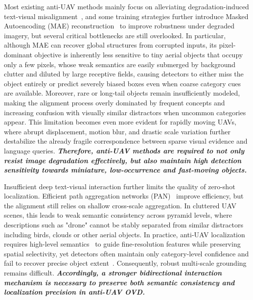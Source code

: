 \documentclass[letterpaper, 10 pt, conference]{ieeeconf}  %
\begin{document}
Most existing anti-UAV methods mainly focus on alleviating degradation-induced text-visual misalignment~\cite{drones9070495,zhu2019visdrone}, and some training strategies further introduce Masked Autoencoding (MAE) reconstruction~\cite{he2022mae,kang2023deblurmae} to improve robustness under degraded imagery, but several critical bottlenecks are still overlooked. In particular, although MAE can recover global structures from corrupted inputs, its pixel-dominant objective is inherently less sensitive to tiny aerial objects that occupy only a few pixels, whose weak semantics are easily submerged by background clutter and diluted by large receptive fields, causing detectors to either miss the object entirely or predict severely biased boxes even when coarse category cues are available. Moreover, rare or long-tail objects remain insufficiently modeled, making the alignment process overly dominated by frequent concepts and increasing confusion with visually similar distractors when uncommon categories appear. This limitation becomes even more evident for rapidly moving UAVs, where abrupt displacement, motion blur, and drastic scale variation further destabilize the already fragile correspondence between sparse visual evidence and language queries. \textbf{\textit{Therefore, anti-UAV methods are required to not only resist image degradation effectively, but also maintain high detection sensitivity towards miniature, low-occurrence and fast-moving objects.}}

Insufficient deep text-visual interaction further limits the quality of zero-shot localization. Efficient path aggregation networks (PAN)~\cite{cheng2024yoloworld,wang2025yoloe} improve efficiency, but the alignment still relies on shallow cross-scale aggregation. In cluttered UAV scenes, this leads to weak semantic consistency across pyramid levels, where descriptions such as "drone" cannot be stably separated from similar distractors including birds, clouds or other aerial objects. In practice, anti-UAV localization requires high-level semantics~\cite{cao_hift_2021} to guide fine-resolution features while preserving spatial selectivity, yet detectors often maintain only category-level confidence and fail to recover precise object extent~\cite{gu2022vild,zhong2022regionclip}. Consequently, robust multi-scale grounding remains difficult. \textbf{\textit{Accordingly, a stronger bidirectional interaction mechanism is necessary to preserve both semantic consistency and localization precision in anti-UAV OVD.}}
\end{document}

